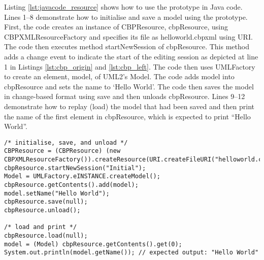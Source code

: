 Listing \ref{lst:javacode_resource} shows how to use the prototype in Java code. Lines 1–8 demonstrate how to initialise and save a model using the prototype. First, the code creates an instance of \textsf{CBPResource}, \textsf{cbpResource}, using \textsf{CBPXMLResourceFactory} and specifies its file as \textsf{helloworld.cbpxml} using \textsf{URI}. The code then executes method \textsf{startNewSession} of \textsf{cbpResource}. This method adds a change event to indicate the start of the editing session as depicted at line 1 in Listings \ref{lst:cbp_origin} and \ref{lst:cbp_left}.
The code then uses \textsf{UMLFactory} to create an element, \textsf{model}, of UML2’s \textsf{Model}. The code adds \textsf{model} into \textsf{cbpResource} and sets the name to ‘Hello World’. The code then saves the model in change-based format using \textsf{save} and then unloads \textsf{cbpResource}. Lines 9–12 demonstrate how to replay (load) the model that had been saved and then print the name of the first element in \textsf{cbpResource}, which is expected to print “Hello World”.

\vspace{-20pt}
\begin{lstlisting}[style=java,caption={An example how to use \textsf{CBPResource} in Java code.},label=lst:javacode_resource]
/* initialise, save, and unload */
CBPResource = (CBPResource) (new CBPXMLResourceFactory()).createResource(URI.createFileURI("helloworld.cbpxml"));
cbpResource.startNewSession("Initial");
Model = UMLFactory.eINSTANCE.createModel();
cbpResource.getContents().add(model);
model.setName("Hello World");
cbpResource.save(null);
cbpResource.unload();

/* load and print */
cbpResource.load(null);
model = (Model) cbpResource.getContents().get(0);
System.out.println(model.getName()); // expected output: "Hello World"
\end{lstlisting}

